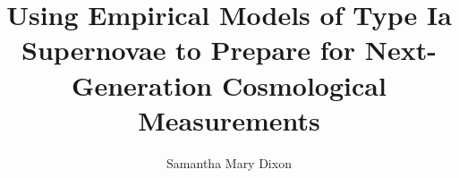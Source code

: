 \documentclass{ucbthesis}
\begin{document}

\title{Using Empirical Models of Type Ia Supernovae to Prepare for Next-Generation Cosmological Measurements}
\author{Samantha Mary Dixon}


\maketitle
\copyrightpage


\end{document}
